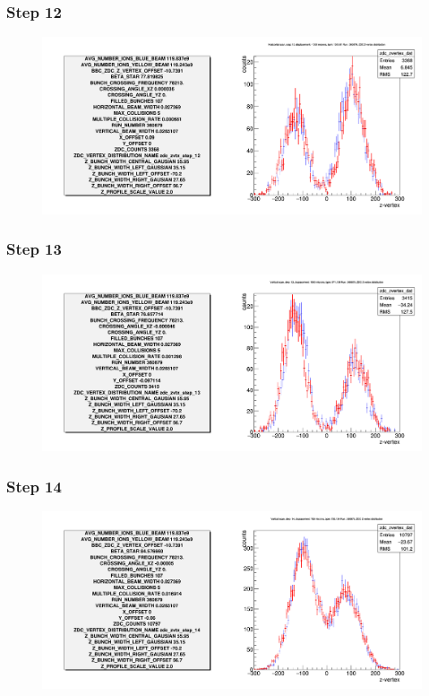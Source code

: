 \begin{frame}
  \frametitle{Step 12}
  \begin{figure}
    \includegraphics[width=\linewidth]{"./figures/tuned_simulation_step_12"}
    \caption{}
    \label{fig:step_12}
  \end{figure}
\end{frame}

\begin{frame}
  \frametitle{Step 13}
  \begin{figure}
    \includegraphics[width=\linewidth]{"./figures/tuned_simulation_step_13"}
    \caption{}
    \label{fig:step_13}
  \end{figure}
\end{frame}

\begin{frame}
  \frametitle{Step 14}
  \begin{figure}
    \includegraphics[width=\linewidth]{"./figures/tuned_simulation_step_14"}
    \caption{}
    \label{fig:step_14}
  \end{figure}
\end{frame}


